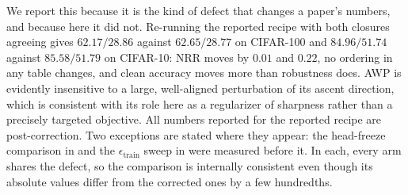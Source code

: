 We report this because it is the kind of defect that changes a paper's numbers, and because here it
did not. Re-running the reported recipe with both closures agreeing gives $62.17/28.86$ against
$62.65/28.77$ on CIFAR-100 and $84.96/51.74$ against $85.58/51.79$ on CIFAR-10: NRR moves by $0.01$
and $0.22$, no ordering in any table changes, and clean accuracy moves more than robustness does. AWP
is evidently insensitive to a large, well-aligned perturbation of its ascent direction, which is
consistent with its role here as a regularizer of sharpness rather than a precisely targeted objective.
All numbers reported for the reported recipe are post-correction. Two exceptions are stated where they
appear: the head-freeze comparison in  and the
$\epsilon_{\mathrm{train}}$ sweep in  were measured before it. In each, every arm
shares the defect, so the comparison is internally consistent even though its absolute values differ
from the corrected ones by a few hundredths.
